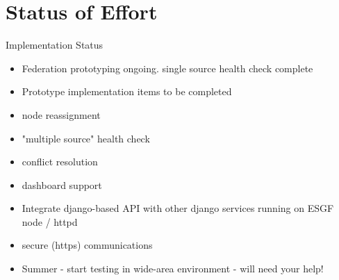 \documentclass{beamer}
\begin{document}
\section{Status of Effort}
\begin{frame}{Implementation Status}

\begin{itemize}
\item
Federation prototyping ongoing.   single source health check complete
\item
 Prototype implementation items to be completed
 \item
  node reassignment
\item
"multiple source" health check
\item

 conflict resolution
\item

 dashboard support
\item
Integrate django-based API with other django services running on ESGF node / httpd
\item
secure (https) communications

 \item
Summer - start testing in wide-area environment - will need your help!
\end{itemize}
\end{frame}
\end{document}
